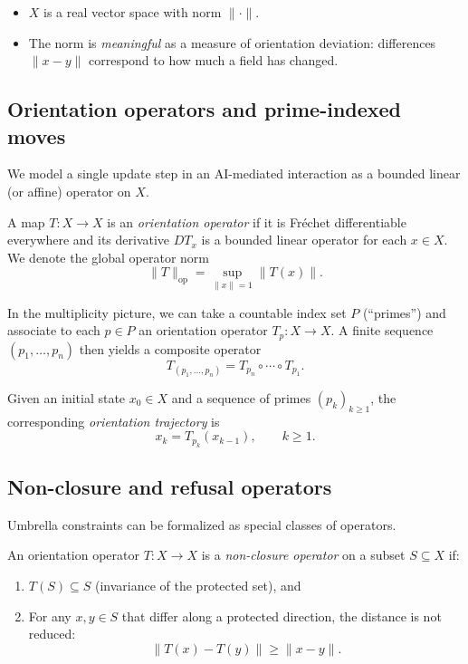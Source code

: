\documentclass[11pt]{article}
\begin{document}
\begin{itemize}
  \item \(X\) is a real vector space with norm \(\|\cdot\|\).
  \item The norm is \emph{meaningful} as a measure of orientation deviation: differences \(\|x - y\|\) correspond to how much a field has changed.
\end{itemize}

\subsection{Orientation operators and prime-indexed moves}

We model a single update step in an AI-mediated interaction as a bounded linear (or affine) operator on \(X\).

\begin{definition}
A map \(T : X \to X\) is an \emph{orientation operator} if it is Fréchet differentiable everywhere and its derivative \(DT_x\) is a bounded linear operator for each \(x \in X\). We denote the global operator norm
\[
\|T\|_{\mathrm{op}} = \sup_{\|x\| = 1} \|T(x)\|.
\]
\end{definition}

In the multiplicity picture, we can take a countable index set \(P\) (``primes'') and associate to each \(p \in P\) an orientation operator \(T_p : X \to X\). A finite sequence \((p_1,\dots,p_n)\) then yields a composite operator
\[
T_{(p_1,\dots,p_n)} = T_{p_n} \circ \cdots \circ T_{p_1}.
\]

\begin{definition}
Given an initial state \(x_0 \in X\) and a sequence of primes \((p_k)_{k \ge 1}\), the corresponding \emph{orientation trajectory} is
\[
x_{k} = T_{p_k}(x_{k-1}), \qquad k \ge 1.
\]
\end{definition}

\subsection{Non-closure and refusal operators}

Umbrella constraints can be formalized as special classes of operators.

\begin{definition}
An orientation operator \(T : X \to X\) is a \emph{non-closure operator} on a subset \(S \subseteq X\) if:
\begin{enumerate}
  \item \(T(S) \subseteq S\) (invariance of the protected set), and
  \item For any \(x,y \in S\) that differ along a protected direction, the distance is not reduced:
  \[
  \|T(x) - T(y)\| \ge \|x - y\|.
  \]
\end{enumerate}
\end{definition}
\end{document}
